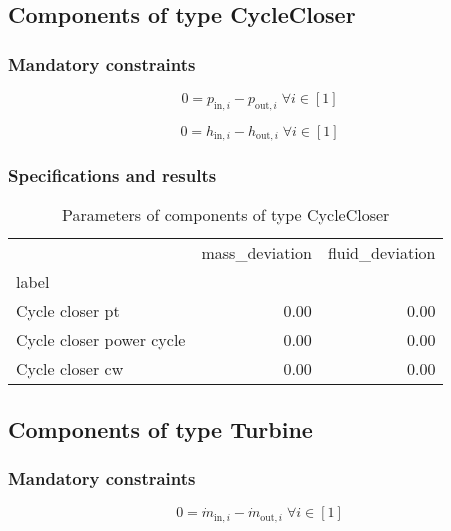 \documentclass[]{article}
\begin{document}
\subsection{Components of type CycleCloser}

\subsubsection{Mandatory constraints}

\begin{equation}
\label{eq:CycleCloser_pressure_equality_constraints}
0=p_{\mathrm{in,}i}-p_{\mathrm{out,}i}\; \forall i \in [1]
\end{equation}

\begin{equation}
\label{eq:CycleCloser_enthalpy_equality_constraints}
0=h_{\mathrm{in,}i}-h_{\mathrm{out,}i}\; \forall i \in [1]
\end{equation}


\subsubsection{Specifications and results}

\begin{table}[H]
\centering
\caption{Parameters of components of type CycleCloser}
\begin{tabular}{lrr}
\toprule
{} & mass\_deviation & fluid\_deviation \\
label                    &                 &                  \\
\midrule
Cycle closer pt          &            0.00 &             0.00 \\
Cycle closer power cycle &            0.00 &             0.00 \\
Cycle closer cw          &            0.00 &             0.00 \\
\bottomrule
\end{tabular}
\end{table}
\subsection{Components of type Turbine}

\subsubsection{Mandatory constraints}

\begin{equation}
\label{eq:Turbine_mass_flow_constraints}
0=\dot{m}_{\mathrm{in,}i}-\dot{m}_{\mathrm{out,}i}\; \forall i \in [1]
\end{equation}
\end{document}
